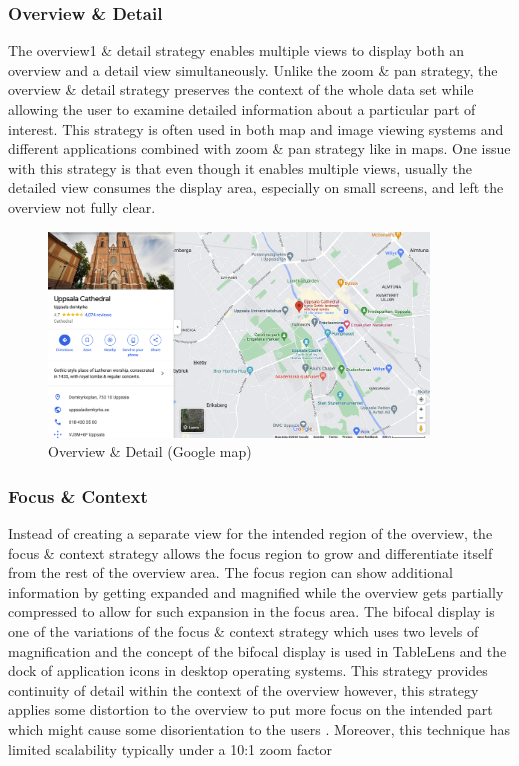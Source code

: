 \subsubsection{Overview \& Detail}

The overview1 \& detail strategy enables multiple views to display both an overview and a detail view simultaneously. Unlike the zoom \& pan strategy, the overview \& detail strategy preserves the context of the whole data set while allowing the user to examine detailed information about a particular part of interest. This strategy is often used in both map and image viewing systems \cite{plaisant1995image} and different applications combined with zoom \& pan strategy like in maps. One issue with this strategy is that even though it enables multiple views, usually the detailed view consumes the display area, especially on small screens, and left the overview not fully clear.

\begin{figure}[H]
\centering
\captionsetup{justification=centering}
\includegraphics[width=0.9\textwidth]{Report-latex/tex_files/pics/over.png}
\caption{Overview \& Detail (Google map)}
\end{figure}

\subsubsection{Focus \& Context}

Instead of creating a separate view for the intended region of the overview, the focus \& context strategy allows the focus region to grow and differentiate itself from the rest of the overview area. The focus region can show additional information by getting expanded and magnified while the overview gets partially compressed to allow for such expansion in the focus area. The bifocal display is one of the variations of the focus \& context strategy which uses two levels of magnification and the concept of the bifocal display is used in TableLens \cite{rao1994table} and the dock of application icons in desktop operating systems. This strategy provides continuity of detail within the context of the overview however, this strategy applies some distortion to the overview to put more focus on the intended part which might cause some disorientation to the users \cite{baudisch2002keeping}. Moreover, this technique has limited scalability typically under a 10:1 zoom factor \cite{salvendy2012handbook}

